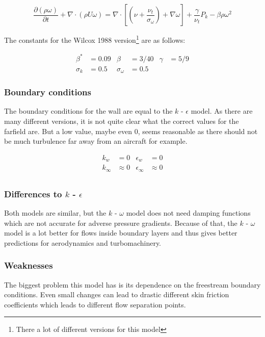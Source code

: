 \begin{equation}
    \frac{\partial (\rho \omega)}{\partial t} + 
    \nabla \cdot (\rho U \omega) =
    \nabla \cdot \left[ 
        \left( \nu + \frac{\nu_t}{\sigma_{\omega}}\right) + \nabla  \omega
    \right] + \frac{\gamma}{\nu_t} P_k - \beta \rho \omega^2
\end{equation}

\noindent The constants for the Wilcox 1988 version\footnote{There a lot of
different versions for this model} are as follows: \cite{nasatmr}

\begin{align*}
    \beta^{*}   &= 0.09    & \beta              &= 3/40  & \gamma &= 5/9\\
    \sigma_k    &= 0.5     & \sigma_{\omega}    &= 0.5
\end{align*}


\subsubsection{Boundary conditions}
The boundary conditions for the wall are equal to the $k$ - $\epsilon$ model.
As there are many different versions, it is not quite clear what the correct
values for the farfield are. But a low value, maybe even 0, seems reasonable as
there should not be much turbulence far away from an aircraft for example.
\cite{cfd101_k-omega}

\begin{align*}
    k_{w}        &= 0           &\epsilon_{w}       &= 0 \\
    k_{\infty}   &\approx 0     &\epsilon_{\infty}  &\approx 0 \\
\end{align*}


\subsubsection{Differences to $k$ - $\epsilon$}
Both models are similar, but the $k$ - $\omega$ model does not need damping
functions which are not accurate for adverse pressure gradients. Because of
that, the $k$ - $\omega$ model is a lot better for flows inside boundary layers
and thus gives better predictions for aerodynamics and turbomachinery.


\subsubsection{Weaknesses}
The biggest problem this model has is its dependence on the freestream boundary
conditions. Even small changes can lead to drastic different skin friction
coefficients which leads to different flow separation points.
\cite{cfd101_k-omega}








